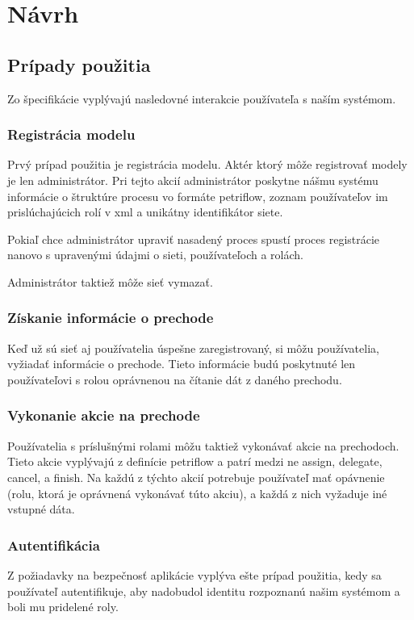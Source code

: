 \section{Návrh}

\subsection{Prípady použitia}
Zo špecifikácie vyplývajú nasledovné interakcie používateľa s naším systémom.

\subsubsection{Registrácia modelu}
Prvý prípad použitia je registrácia modelu. Aktér ktorý môže registrovať modely je len administrátor. Pri tejto akcií administrátor poskytne nášmu systému informácie o štruktúre procesu vo formáte petriflow, zoznam používateľov im prislúchajúcich rolí v \acrshort{xml} a unikátny identifikátor siete.

Pokiaľ chce administrátor upraviť nasadený proces spustí proces registrácie nanovo s upravenými údajmi o sieti, používateľoch a rolách.

Administrátor taktiež môže sieť vymazať.

\subsubsection{Získanie informácie o prechode}
Keď už sú sieť aj používatelia úspešne zaregistrovaný, si môžu používatelia, vyžiadať informácie o prechode. Tieto informácie budú poskytnuté len používateľovi s rolou oprávnenou na čítanie dát z daného prechodu.

\subsubsection{Vykonanie akcie na prechode}
Používatelia s príslušnými rolami môžu taktiež vykonávať akcie na prechodoch. Tieto akcie vyplývajú z definície petriflow a patrí medzi ne assign, delegate, cancel, a finish. Na každú z týchto akcií potrebuje používateľ mať opávnenie (rolu, ktorá je oprávnená vykonávať túto akciu), a každá z nich vyžaduje iné vstupné dáta.

\subsubsection{Autentifikácia}
Z požiadavky na bezpečnosť aplikácie vyplýva ešte prípad použitia, kedy sa používateľ autentifikuje, aby nadobudol identitu rozpoznanú našim systémom a boli mu pridelené roly.

